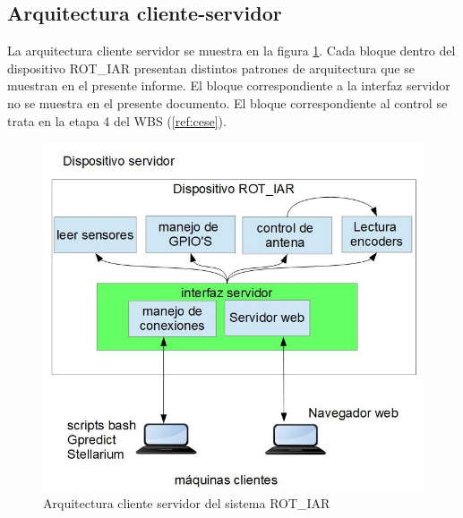 \documentclass[12pt,a4paper, twosite]{article}
\begin{document}
	\subsection{Arquitectura cliente-servidor}
	La arquitectura cliente servidor se muestra en la figura \ref{fig:arq-cl-s}. Cada bloque dentro del dispositivo ROT\_IAR presentan distintos patrones de arquitectura que se muestran en el presente informe. El bloque correspondiente a la interfaz servidor no se muestra en el presente documento. El bloque correspondiente al control se trata en la etapa 4 del WBS (\ref{ref:cese}). 
	\begin{figure}[h!]
		\includegraphics{arqClienteServidor.jpg} 
		\caption{Arquitectura cliente servidor del sistema ROT\_IAR} 
		\label{fig:arq-cl-s}
	\end{figure}
	
	
\end{document}

